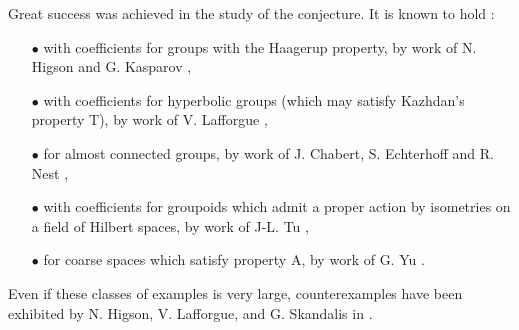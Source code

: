 Great success was achieved in the study of the conjecture. It is known to hold :\\
\begin{itemize}
\item[$\bullet$] with coefficients for groups with the Haagerup property, by work of N. Higson and G. Kasparov \cite{higsonkasparov},
\item[$\bullet$] with coefficients for hyperbolic groups (which may satisfy Kazhdan's property T), by work of V. Lafforgue \cite{Lafforgue}, 
\item[$\bullet$] for almost connected groups, by work of J. Chabert, S. Echterhoff and R. Nest \cite{chabertEN},
\item[$\bullet$] with coefficients for groupoids which admit a proper action by isometries on a field of Hilbert spaces, by work of J-L. Tu \cite{TuThese},
\item[$\bullet$] for coarse spaces which satisfy property A, by work of G. Yu \cite{Yu2}.\\
\end{itemize}  
Even if these classes of examples is very large, counterexamples have been exhibited by N. Higson, V. Lafforgue, and G. Skandalis in \cite{HigsonLaffSk}.\\

